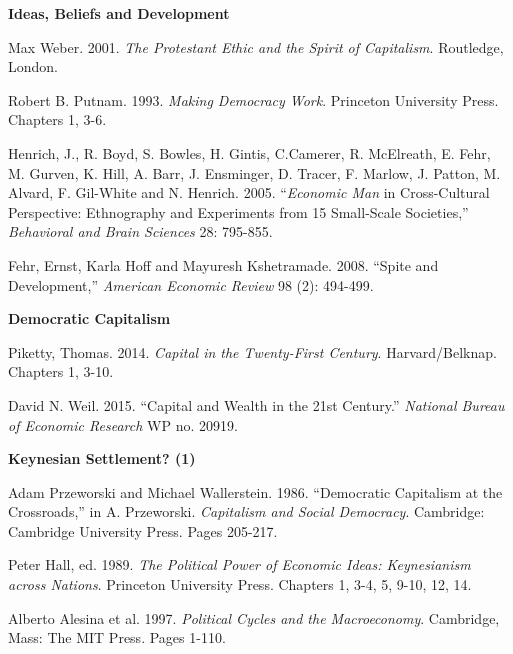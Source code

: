 \documentclass[letterpaper]{article}
\renewenvironment{itemize}{
  \begin{list}{}{
    \setlength{\leftmargin}{1.5em}
  }
}{
  \end{list}
}
\begin{document}
\begin{enumerate}
\item {\bf Ideas, Beliefs and Development}
	\begin{itemize}
		\item[$\bullet$] Max Weber. 2001. \emph{The Protestant Ethic and the Spirit of Capitalism}. Routledge, London. 
		\item[$\bullet$] Robert B. Putnam. 1993. \emph{Making Democracy Work}. Princeton University Press. Chapters 1, 3-6.
		\item[$\bullet$]  Henrich, J., R. Boyd, S. Bowles, H. Gintis, C.Camerer, R. McElreath, E. Fehr, M. Gurven, K. Hill, A. Barr, J. Ensminger, D. Tracer, F. Marlow, J. Patton, M. Alvard, F. Gil-White and N. Henrich. 2005. ``\emph{Economic Man} in Cross-Cultural Perspective: Ethnography and Experiments from 15 Small-Scale Societies,'' \emph{Behavioral and Brain Sciences} 28: 795-855.
		\item[$\bullet$]  Fehr, Ernst, Karla Hoff and Mayuresh Kshetramade. 2008. ``Spite and Development,'' \emph{American Economic Review} 98 (2): 494-499.
	\end{itemize}


\item {\bf Democratic Capitalism}

	\begin{itemize}
		\item[$\bullet$] Piketty, Thomas. 2014. \emph{Capital in the Twenty-First Century}. Harvard/Belknap. Chapters 1, 3-10.
		\item[$\bullet$] David N. Weil. 2015. ``Capital and Wealth in the 21st Century.'' \emph{National Bureau of Economic Research} WP no. 20919.
	\end{itemize}


\item {\bf Keynesian Settlement? (1)}

	\begin{itemize}
		\item[$\bullet$] Adam Przeworski and Michael Wallerstein. 1986. ``Democratic Capitalism at the Crossroads,'' in A. Przeworski. \emph{Capitalism and Social Democracy}. Cambridge: Cambridge University Press. Pages 205-217.
		\item[$\bullet$] Peter Hall, ed. 1989. \emph{The Political Power of Economic Ideas: Keynesianism across Nations}. Princeton University Press. Chapters 1, 3-4, 5, 9-10, 12, 14.
		\item[$\bullet$] Alberto Alesina et al. 1997. \emph{Political Cycles and the Macroeconomy}. Cambridge, Mass: The MIT Press. Pages 1-110.
	\end{itemize}


\end{enumerate}
\end{document}
